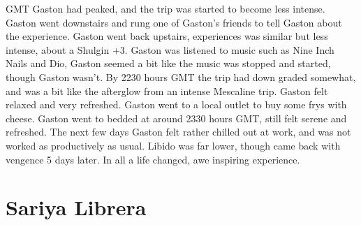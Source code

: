 \documentclass[12pt]{book}
\begin{document}
GMT Gaston had peaked, and the trip was started to become less intense. Gaston went downstairs and rung one of Gaston's friends to tell Gaston about the experience. Gaston went back upstairs, experiences was similar but less intense, about a Shulgin +3. Gaston was listened to music such as Nine Inch Nails and Dio, Gaston seemed a bit like the music was stopped and started, though Gaston wasn't. By 2230 hours GMT the trip had down graded somewhat, and was a bit like the afterglow from an intense Mescaline trip. Gaston felt relaxed and very refreshed. Gaston went to a local outlet to buy some frys with cheese. Gaston went to bedded at around 2330 hours GMT, still felt serene and refreshed. The next few days Gaston felt rather chilled out at work, and was not worked as productively as usual. Libido was far lower, though came back with vengence 5 days later. In all a life changed, awe inspiring experience.



\chapter{Sariya Librera}
\end{document}
